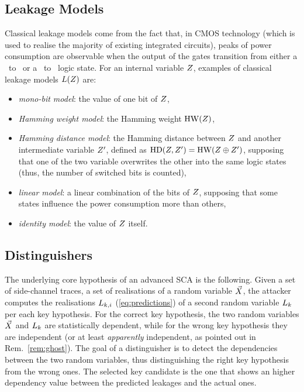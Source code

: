 \subsection{Leakage Models}\label{sec:leakage_models}
Classical leakage models come from the fact that, in CMOS technology (which is used to realise the majority of existing integrated circuits), peaks of power consumption are observable when the output of the gates transition from either a \textquotedbl \  to \textquotedbl \ or a \textquotedbl \ to \textquotedbl \ logic state.  For an internal variable $Z$, examples of classical leakage models $L(Z)$ are:
\begin{itemize}
\item \emph{mono-bit model}: the value of one bit of $Z$,
\item\emph{Hamming weight model}: the Hamming weight $\mathrm{HW}(Z)$,
\item \emph{Hamming distance model}: the Hamming distance between $Z$ and another intermediate variable $Z^\prime$, defined as $\mathrm{HD}(Z,Z^\prime) = \mathrm{HW}(Z\oplus Z^\prime)$, supposing \eg that one of the two variable overwrites the other into the same logic states (thus, the number of switched bits is counted),
\item \emph{linear model}: a linear combination of the bits of $Z$, supposing that some states influence the power consumption more than others, 
\item \emph{identity model}: the value of $Z$ itself.
\end{itemize} 

\subsection{Distinguishers}\label{sec:distinguishers}
The underlying core hypothesis of an advanced SCA is the following. Given a set of side-channel traces, \ie a set of realisations of a random variable $\vec{X}$, the attacker computes the realisations $L_{k,i}$ (\via \eqref{eq:predictions}) of a second random variable $L_k$ per each key hypothesis. For the correct key hypothesis, the two random variables $\vec{X}$ and $L_k$ are statistically dependent, while for the wrong key hypothesis they are independent (or at least \emph{apparently} independent, as pointed out in Rem.~\ref{rem:ghost}). The goal of a distinguisher is to detect the dependencies between the two random variables, thus distinguishing the right key hypothesis from the wrong ones. The selected key candidate is the one that shows an higher dependency value between the  predicted leakages and the actual ones. 

